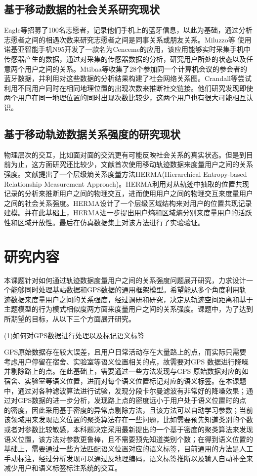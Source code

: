\subsection{基于移动数据的社会关系研究现状}
Eagle等招募了100名志愿者，记录他们手机上的蓝牙信息，以此为基础，通过分析志愿者之间的相遇次数来研究志愿者之间是同事关系或朋友关系。Miluzzo等 使用诺基亚智能手机N95开发了一款名为Cenceme的应用，该应用能够实时采集手机中传感器产生的数据，通过对采集的传感器数据的分析，研究用户所处的状态以及任意两个用户之间的关系。Mtibaa等收集了28个参加同一个计算机会议的参会者的蓝牙数据，并利用对这些数据的分析结果构建了社会网络关系图。Crandall等尝试利用不同用户同时在相同地理位置的出现次数来推断社交链接。他们研究发现即使两个用户在同一地理位置的同时出现次数比较少，这两个用户也有很大可能相互认识。

\subsection{基于移动轨迹数据关系强度的研究现状}
物理层次的交互，比如面对面的交流更有可能反映社会关系的真实状态。但是到目前为止，这方面研究还比较少，文献\cite{ma2014effective}首次使用移动轨迹数据来度量用户之间的关系强度。文献\cite{ma2014effective}提出了一个层级熵关系度量方法HERMA(Hierarchical Entropy-based Relationship Measurement Approach)。HERMA利用对从轨迹中抽取的位置共现记录的分析来推断用户之间的物理交互，进而使用用户之间的物理交互来度量用户之间的社会关系强度。HERMA设计了一个层级区域结构来对用户的位置共现记录建模。并在此基础上，HERMA进一步提出用户熵和区域熵分别来度量用户的活跃性和区域开放性。最后在仿真数据集上对该方法进行了实验验证。

\section{研究内容}
本课题针对如何通过轨迹数据度量用户之间的关系强度问题展开研究，力求设计一个能够同时处理基站数据和GPS数据的通用框架模型。希望能从多个角度利用轨迹数据来度量用户之间的关系强度，经过调研和研究，决定从轨迹空间距离和基于主题模型的行为模式相似度两方面来度量用户之间的关系强度。课题中，为了达到所期望的目标，从以下三个方面展开研究。
\par (1)如何对GPS数据进行处理以及标记语义标签
\par GPS原始数据存在较大误差，且用户日常活动存在大量路上的点，而实际只需要考虑用户停留在宿舍、实验室等语义位置相关的点，故需要对GPS 数据进行降噪并剔除路上的点。在此基础上，需要通过一些方法发现与GPS 原始数据对应的如宿舍、实验室等语义位置，进而对每个语义位置标记对应的语义标签。在本课题中，通过对各种滤波算法进行试验，发现分段卡尔曼滤波有非常好的降噪效果；通过对GPS数据的进一步分析，发现路上点的密度远小于用户处于语义位置时的点的密度，因此采用基于密度的异常点剔除方法，且该方法可以自动学习参数；当前该领域用来发现语义位置的聚类算法存在一些问题，比如需要预先知道类别的个数或者对参数比较敏感，本科题决定采用最新提出的一个基于密度的聚类算法来发现语义位置，该方法对参数更鲁棒，且不需要预先知道类别个数；在得到语义位置的基础上，需要通过一些方法匹配语义位置对应的语义标签，目前通用的方法是人工手动标注，经过分析发现可以通过反地理编码，语义标签推断以及输入自动补全来减少用户和语义标签标注系统的交互。

